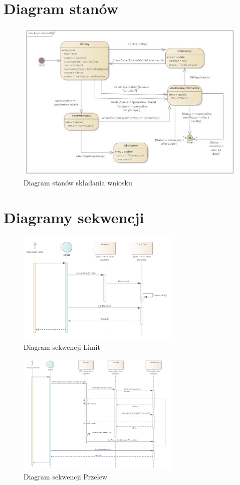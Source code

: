 \section{Diagram stanów}
\begin{figure}[H]
	\centering
	\includegraphics[width=1\textwidth]{images/Wniosek.jpg}
	\caption{Diagram stanów składania wniosku}
	\label{fig:StateMachine}
\end{figure}
\section{Diagramy sekwencji}
\begin{figure}[H]
	\centering
	\includegraphics[width=0.7\textwidth]{images/Limit.png}
	\caption{Diagram sekwencji Limit}
	\label{fig:Seq1}
\end{figure}
\begin{figure}[H]
	\centering
	\includegraphics[width=0.7\textwidth]{images/Przelew.png}
	\caption{Diagram sekwencji Przelew}
	\label{fig:Seq2}
\end{figure}